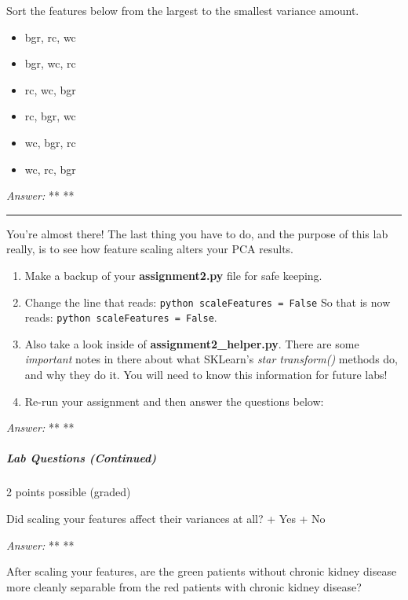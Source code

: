 \documentclass[11pt]{article}
\providecommand{\tightlist}{%
      \setlength{\itemsep}{0pt}\setlength{\parskip}{0pt}}
\begin{document}
Sort the features below from the largest to the smallest variance
amount.

\begin{itemize}
\tightlist
\item
  bgr, rc, wc
\item
  bgr, wc, rc
\item
  rc, wc, bgr
\item
  rc, bgr, wc
\item
  wc, bgr, rc
\item
  wc, rc, bgr
\end{itemize}

\emph{Answer:} ** **

\begin{center}\rule{0.5\linewidth}{\linethickness}\end{center}

You're almost there! The last thing you have to do, and the purpose of
this lab really, is to see how feature scaling alters your PCA results.

\begin{enumerate}
\def\labelenumi{\arabic{enumi}.}
\tightlist
\item
  Make a backup of your \textbf{assignment2.py} file for safe keeping.
\item
  Change the line that reads: \texttt{python\ scaleFeatures\ =\ False}
  So that is now reads: \texttt{python\ scaleFeatures\ =\ False}.
\item
  Also take a look inside of \textbf{assignment2\_helper.py}. There are
  some \emph{important} notes in there about what SKLearn's \emph{star
  transform()} methods do, and why they do it. You will need to know
  this information for future labs!
\item
  Re-run your assignment and then answer the questions below:
\end{enumerate}

\emph{Answer:} ** **

\hypertarget{lab-questions-continued}{%
\subparagraph{Lab Questions (Continued)}\label{lab-questions-continued}}

2 points possible (graded)

Did scaling your features affect their variances at all? + Yes + No

\emph{Answer:} ** **

After scaling your features, are the green patients without chronic
kidney disease more cleanly separable from the red patients with chronic
kidney disease?
\end{document}
